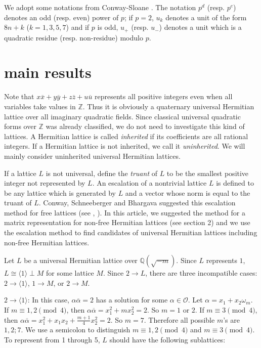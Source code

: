 \documentclass[a4paper,10pt,reqno]{amsart}
\begin{document}
We adopt some notations from Conway-Sloane \cite{jhC_00}. The notation $p^{d}$ (resp. $p^{e}$)
denotes an odd (resp. even) power of $p$; if $p=2$, $u_k$ denotes a unit of the form $8n + k$
($k=1,3,5,7$) and if $p$ is odd, $u_{+}$ (resp. $u_{-}$) denotes a unit which is a quadratic
residue (resp. non-residue) modulo $p$.

\section{main results}
Note that $x{\overline{{x}}}+y{\overline{{y}}}+z{\overline{{z}}}+u{\overline{{u}}}$ represents all
positive integers even when all variables take values in ${\mathbb{Z}}$. Thus
it is obviously a quaternary universal Hermitian lattice over all
imaginary quadratic fields. Since classical universal quadratic
forms over ${\mathbb{Z}}$ was already classified, we do not need to
investigate this kind of lattices. A Hermitian lattice is called
\emph{inherited} if its coefficients are all rational integers. If a
Hermitian lattice is not inherited, we call it \emph{uninherited}.
We will mainly consider uninherited universal Hermitian lattices.

If a lattice $L$ is not universal, define the \emph{truant} of $L$
to be the smallest positive integer not represented by $L$. An
escalation of a nontrivial lattice $L$ is defined to be any lattice
which is generated by $L$ and a vector whose norm is equal to the
truant of $L$. Conway, Schneeberger and Bhargava suggested this
escalation method for free lattices (see \cite{jhC_wS},
\cite{mB_00}). In this article, we suggested the method for a matrix
representation for non-free Hermitian lattices (see section 2) and
we use the escalation method to find candidates of universal
Hermitian lattices including non-free Hermitian lattices.

Let $L$ be a universal Hermitian lattice over ${\mathbb{Q}(\sqrt{{-m}})}$. Since $L$ represents $1$, $L \cong {\langle {1} \rangle}
\perp M$ for some lattice $M$. Since $2 \to L$, there are three incompatible cases: $2 \to {\langle {1} \rangle}$,
$1 \to M$, or $2 \to M$.

{} $2 \to {\langle {1} \rangle}$: In this case, $\alpha {\overline{{\alpha}}} = 2$
has a solution for some $\alpha \in {\mathcal{O}}$. Let $\alpha = x_1 + x_2
\omega_m$. If $m \equiv 1, 2 \pmod{4}$, then $\alpha {\overline{{\alpha}}} =
x_1^2 + m x_2^2 =2$. So $m = 1$ or $2$. If $m \equiv 3 \pmod{4}$,
then $\alpha {\overline{{\alpha}}} = x_1^2 + x_1 x_2 + \frac{m+1}{4} x_2^2
=2$. So $m = 7$. Therefore all possible $m$'s are $1,2;7$. We use a
semicolon to distinguish $m \equiv 1, 2 \pmod{4}$ and $m \equiv 3
\pmod{4}$. To represent from 1 through 5, $L$ should have the
following sublattices:
\end{document}
